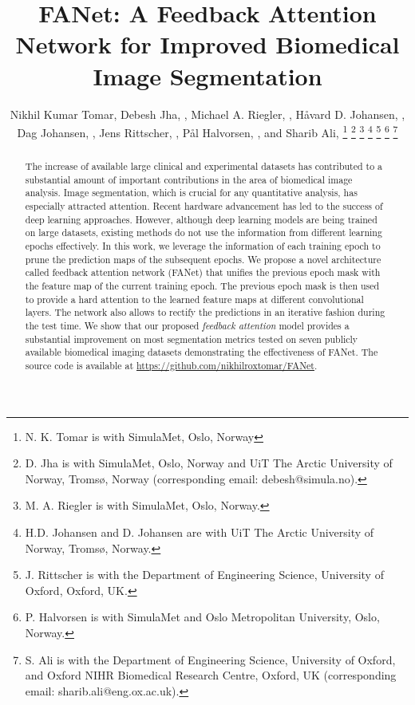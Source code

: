 \documentclass[journal]{IEEEtran}
\begin{document}
\title{{FANet:} A Feedback Attention Network for Improved Biomedical Image Segmentation}
\author{Nikhil Kumar Tomar, 
Debesh Jha, , 
Michael A. Riegler, , 
H{\aa}vard D. Johansen, ,
Dag Johansen, , 
Jens Rittscher, ,
P{\aa}l Halvorsen, , and 
Sharib Ali, 
\thanks{N. K. Tomar is with SimulaMet, Oslo, Norway}
\thanks{D. Jha is with SimulaMet, Oslo, Norway and UiT The Arctic University of Norway, Troms{\o}, Norway (corresponding email: debesh@simula.no).}
\thanks{M. A. Riegler is with SimulaMet, Oslo, Norway.}
\thanks{H.D. Johansen and D. Johansen are with UiT The Arctic University of Norway, Troms{\o}, Norway.}
\thanks{J. Rittscher is with the Department of Engineering Science, University of Oxford, Oxford, UK.}
\thanks{P. Halvorsen is with SimulaMet and Oslo Metropolitan University, Oslo, Norway.}
\thanks{S. Ali is with the Department of Engineering Science, University of Oxford, and Oxford NIHR Biomedical Research Centre, Oxford, UK (corresponding email: sharib.ali@eng.ox.ac.uk).}
}
\maketitle

\begin{abstract}
The increase of available large clinical and experimental datasets has contributed to a substantial amount of important contributions in the area of biomedical image analysis. Image segmentation, which is crucial for any quantitative analysis, has especially attracted attention. Recent hardware advancement has led to the success of deep learning approaches. However, although deep learning models are being trained on large datasets, existing methods do not use the information from different learning epochs effectively. In this work, we leverage the information of each training epoch to prune the prediction maps of the subsequent epochs. We propose a novel architecture called feedback attention network (FANet) that unifies the previous epoch mask with the feature map of the current training epoch. The previous epoch mask is then used to provide a hard attention to the learned feature maps at different convolutional layers. The network also allows to rectify the predictions in an iterative fashion during the test time. We show that our proposed \textit{feedback attention} model provides a substantial improvement on most segmentation metrics tested on seven publicly available biomedical imaging datasets demonstrating the effectiveness of FANet. The source code is available at \url{https://github.com/nikhilroxtomar/FANet}.

\end{abstract}
\end{document}
